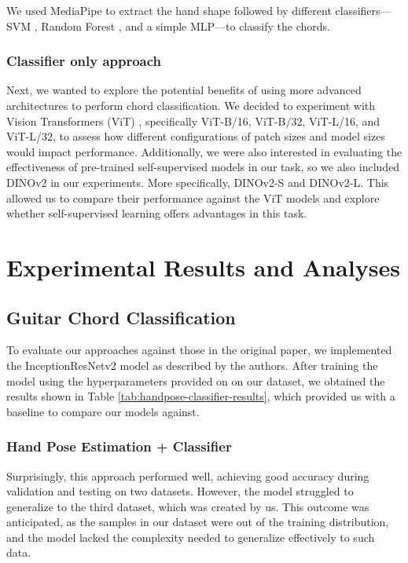 \documentclass[10pt,twocolumn,letterpaper]{article}
\begin{document}
We used MediaPipe to extract the hand shape followed by different classifiers—SVM \cite{cortes1995support}, Random Forest \cite{ho1995random}, and a simple MLP—to classify the chords. 

\subsubsection{Classifier only approach}
Next, we wanted to explore the potential benefits of using more advanced architectures to perform chord classification. We decided to experiment with Vision Transformers (ViT) \cite{dosovitskiy2020image}, specifically ViT-B/16, ViT-B/32, ViT-L/16, and ViT-L/32, to assess how different configurations of patch sizes and model sizes would impact performance. Additionally, we were also interested in evaluating the effectiveness of pre-trained self-supervised models in our task, so we also included DINOv2 \cite{oquab2023dinov2} in our experiments. More specifically, DINOv2-S and DINOv2-L. This allowed us to compare their performance against the ViT models and explore whether self-supervised learning offers advantages in this task.

\section{Experimental Results and Analyses}
\label{sec:results}

\subsection{Guitar Chord Classification}
To evaluate our approaches against those in the original paper, we implemented the InceptionResNetv2 model as described by the authors. After training the model using the hyperparameters provided on \cite{Kristian_Zaman_Tenoyo_Jodhinata_2024} on our dataset, we obtained the results shown in Table \ref{tab:handpose-classifier-results}, which provided us with a baseline to compare our models against.

\subsubsection{Hand Pose Estimation + Classifier}
Surprisingly, this approach performed well, achieving good accuracy during validation and testing on two datasets. However, the model struggled to generalize to the third dataset, which was created by us. This outcome was anticipated, as the samples in our dataset were out of the training distribution, and the model lacked the complexity needed to generalize effectively to such data.
\end{document}
